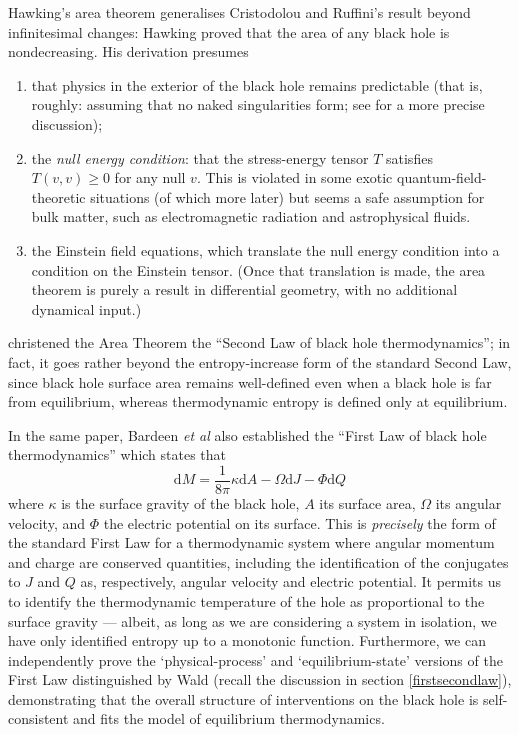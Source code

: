 \documentclass[12pt]{article}
\newcommand{\be}{\begin{equation}}
\newcommand{\ee}{\end{equation}}
\begin{document}
Hawking's area theorem \cite{hawkingarea} generalises Cristodolou and Ruffini's result beyond infinitesimal changes: Hawking proved that the area of any black hole is nondecreasing. His derivation presumes
\begin{enumerate}
\item that physics in the exterior of the black hole remains predictable (that is, roughly: assuming that no naked singularities form; see  for a more precise discussion);
\item the \emph{null energy condition}: that the stress-energy tensor $T$ satisfies $T(v,v)\geq 0$ for any null $v$. This is violated in some exotic quantum-field-theoretic situations (of which more later) but seems a safe assumption for bulk matter, such as electromagnetic radiation and astrophysical fluids.
\item the Einstein field equations, which translate the null energy condition into a condition on the Einstein tensor. (Once that translation is made, the area theorem is purely a result in differential geometry, with no additional dynamical input.)
\end{enumerate}

  christened the Area Theorem the ``Second Law of black hole thermodynamics''; in fact, it goes rather beyond the entropy-increase form of the standard Second Law, since black hole surface area remains well-defined even when a black hole is far from equilibrium, whereas thermodynamic entropy is defined only at equilibrium.

In the same paper, Bardeen \emph{et al} also established the ``First Law of black hole thermodynamics'' which states that
\be
\mathrm{d}M = \frac{1}{8\pi}\kappa \mathrm{d} A  - \Omega \mathrm{d}J - \Phi \mathrm{d}Q
\ee
where $\kappa$ is the surface gravity of the black hole, $A$ its surface area, $\Omega$ its angular velocity, and $\Phi$ the electric potential on its surface. This is \emph{precisely} the form of the standard First Law for a thermodynamic system where angular momentum and charge are conserved quantities, including the identification of the conjugates to $J$ and $Q$ as, respectively, angular velocity and electric potential. It permits us to identify the thermodynamic temperature of the hole as proportional to the surface gravity --- albeit, as long as we are considering a system in isolation, we have only identified entropy up to a monotonic function. Furthermore, we can independently prove the `physical-process' and `equilibrium-state' versions of the First Law distinguished by Wald (recall the discussion in section \ref{firstsecondlaw}), demonstrating that the overall structure of interventions on the black hole is self-consistent and fits the model of equilibrium thermodynamics. 
\end{document}
